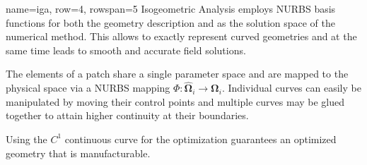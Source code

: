 \documentclass[
   accentcolor=9b,
   boxstyle=boxed
   ]{tudasciposter}
\begin{document}
\begin{tcbposter}[poster={columns=2, rows=8, spacing=1cm}]
\begin{posterboxenv}[title=Isogeometric Analysis]{name=iga, row=4, rowspan=5}
   Isogeometric Analysis employs NURBS basis functions for both the geometry description and as the solution space of the numerical method. This allows to exactly represent curved geometries and at the same time leads to smooth and accurate field solutions.\\

   \begin{center}
      
      \hfill
      
   \end{center}

   The elements of a patch share a single parameter space and are mapped to the physical space via a NURBS mapping $\Phi: \boldsymbol{\hat{\Omega}}_i \to \boldsymbol{\Omega}_i$.
   Individual curves can easily be manipulated by moving their control points and multiple curves may be glued together to attain higher continuity at their boundaries.

   \begin{center}
      
   \end{center}

   Using the $C^1$ continuous curve for the optimization guarantees an optimized geometry that is manufacturable.
\end{posterboxenv}


\end{tcbposter}
\end{document}
